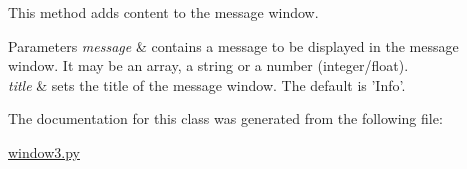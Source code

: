 This method adds content to the message window. 


\begin{DoxyParams}{Parameters}
{\em message} & contains a message to be displayed in the message window. It may be an array, a string or a number (integer/float). \\
\hline
{\em title} & sets the title of the message window. The default is 'Info'. \\
\hline
\end{DoxyParams}


The documentation for this class was generated from the following file\-:\begin{DoxyCompactItemize}
\item 
\hyperlink{window3_8py}{window3.\-py}\end{DoxyCompactItemize}
